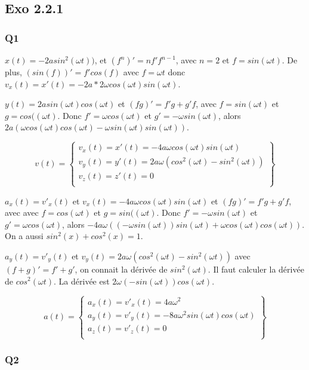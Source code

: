 \documentclass[]{book}
\theoremstyle{definition}
\begin{document}
\subsection*{Exo 2.2.1}
\subsubsection*{Q1}

$x(t) = -2asin^2(\omega t))$, et $\left(f^n\right)' = nf'f^{n-1}$, avec $n=2$
et $f=sin(\omega t)$. De plus, $\left(sin(f)\right)' = f'cos(f)$ avec
$f=\omega t$ donc
$v_x(t) = x'(t) = -2a*2 \omega cos(\omega t) sin(\omega t)$.


$y(t)=2asin(\omega t)cos(\omega t)$ et $\left(fg\right)' = f'g+g'f$,
avec $f=sin(\omega t)$ et $g=cos((\omega t)$. Donc  $f'=\omega
cos(\omega t)$ et $g'=-\omega sin(\omega t)$, alors $2a(\omega cos(\omega t) cos(\omega t)- \omega sin(\omega t) sin(\omega t))$.

$$
v(t) = \left\{
\begin{array}{l} 
  v_x(t) = x'(t) = -4a\omega cos(\omega t) sin(\omega t) \\
  v_y(t) = y'(t) =  2a\omega (cos^2(\omega t) - sin^2(\omega t)) \\
  v_z(t) = z'(t) =  0 \\
\end{array}
\right\}
$$

$a_x(t) = v'_x(t)$ et $v_x(t)= -4a \omega cos(\omega t) sin(\omega t)$ et
$\left(fg\right)' = f'g+g'f$, avec 
avec $f=cos(\omega t)$ et $g=sin((\omega t)$. Donc  $f'=-\omega sin(\omega t)$ et $g'=\omega cos(\omega t)$, alors
$-4a \omega ((-\omega sin(\omega t)) sin(\omega t) + \omega
cos(\omega t) cos(\omega t))$. On a aussi $sin^2(x) + cos^2(x) = 1$.

$a_y(t)= v'_y(t)$ et $v_y(t)= 2a\omega (cos^2(\omega t) - sin^2(\omega t))$ avec
$\left(f+g\right)' = f'+g'$, on connait la d\'eriv\'ee de
$sin^2(\omega t)$. Il faut calculer la d\'eriv\'ee de
$cos^2(\omega t)$. La d\'eriv\'ee est $2 \omega (-sin(\omega t))
cos(\omega t)$. 

$$a(t) = \left\{
\begin{array}{l} 
  a_x(t) = v'_x(t) = 4a \omega^2\\
  a_y(t) = v'_y(t) = -8a \omega^2 sin(\omega t) cos(\omega t)\\
  a_z(t) = v'_z(t) = 0 \\
\end{array}
\right\}
$$

\subsubsection*{Q2}
\end{document}

